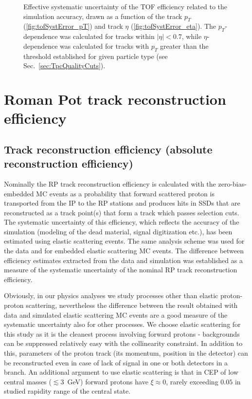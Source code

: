 \begin{figure}[h]
{\begin{subfigure}[b]{\linewidth}
  \end{subfigure}
}%
\caption[Systematic uncertainty of the TOF efficiency related to the TOF simulation accuracy.]%
    {Effective systematic uncertainty of the TOF efficiency related to the simulation accuracy, drawn as a function of the track $p_{T}$ (\ref{fig:tofSystError_pT}) and track $\eta$ (\ref{fig:tofSystError_eta}). The $p_{T}$-dependence was calculated for tracks within $|\eta|<0.7$, while $\eta$-dependence was calculated for tracks with $p_{T}$ greater than the threshold established for given particle type (see Sec.~\ref{sec:TpcQualityCuts}).}\label{fig:tofSystError}%
\end{figure}



\section{Roman Pot track reconstruction efficiency}\label{sec:rpTrackRecoEffSystematics}

\subsection{Track reconstruction efficiency (absolute reconstruction efficiency)}\label{subsec:rpTrackRecoEffSyst}

Nominally the RP track reconstruction efficiency is calculated with the zero-bias-embedded MC events as a probability that forward scattered proton is transported from the IP to the RP stations and produces hits in SSDs that are reconstructed as a track point(s) that form a track which passes selection cuts. The systematic uncertainty of this efficiency, which reflects the accuracy of the simulation (modeling of the dead material, signal digitization etc.), has been estimated using elastic scattering events. The same analysis scheme was used for the data and for embedded elastic scattering MC events. The difference between efficiency estimates extracted from the data and simulation was established as a measure of the systematic uncertainty of the nominal RP track reconstruction efficiency.

Obviously, in our physics analyses we study processes other than elastic proton-proton scattering, nevertheless the difference between the result obtained with data and simulated elastic scattering MC events are a good measure of the systematic uncertainty also for other processes. We choose elastic scattering for this study as it is the cleanest process involving forward protons - backgrounds can be suppressed relatively easy with the collinearity constraint. In addition to this, parameters of the proton track (its momentum, position in the detector) can be reconstructed even in case of lack of signal in one or both detectors in a branch. An additional argument to use elastic scattering is that in CEP of low central masses ($\lesssim3$~GeV) forward protons have $\xi\approx0$, rarely exceeding $0.05$ in studied rapidity range of the central state.%

